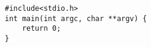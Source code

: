\begin{tcolorbox}[colback=bg, left=0pt, right=0pt, top=0pt, bottom=0pt]
\begin{verbatim}
#include<stdio.h>
int main(int argc, char **argv) {
	return 0;
}
\end{verbatim}
\end{tcolorbox}
